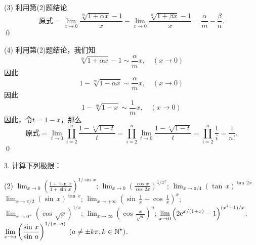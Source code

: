 (3) \solve 利用第(2)题结论
\begin{equation}
    \text{原式} = \lim_{x \to 0} \frac{\sqrt[m]{1+\alpha x}-1}{x} - \lim_{x \to 0} \frac{\sqrt[n]{1+\beta x}-1}{x} = \frac{\alpha}{m} - \frac{\beta}{n}. 
\end{equation}
\qed\bigskip

(4) \solve 利用第(2)题结论，我们知
\begin{equation}
    \sqrt[m]{1+\alpha x} - 1 \sim \frac{\alpha}{m} x, \quad (x \to 0)
\end{equation}
因此
\begin{equation}
    1 - \sqrt[m]{1-\alpha x} \sim \frac{\alpha}{m} x, \quad (x \to 0)
\end{equation}
因此
\begin{equation}
    1 - \sqrt[m]{1-x} \sim \frac{1}{m}x, \quad (x \to 0)
\end{equation}
因此，令$t = 1-x$，那么
\begin{equation}
    \text{原式} = \lim_{t \to 0} \prod_{i=2}^{n} \frac{1-\sqrt[i]{1-t}}{t} = \prod_{i=2}^{n}\lim_{t \to 0} \frac{1-\sqrt[i]{1-t}}{t} = \prod_{i=2}^n \frac{1}{i} = \frac{1}{n!}.
\end{equation}
\qed\bigskip

3. 计算下列极限：
\begin{tasks}(2)
    \task $\displaystyle\lim_{x \to 0}\left(\displaystyle\frac{1+\tan \, x}{1+\sin \, x}\right)^{1/ \sin \, x}$;
    \task $\displaystyle\lim_{x \to 0} \left(\displaystyle\frac{\cos \, x}{\cos \, 2x}\right)^{1/x^2}$;
    \task $\displaystyle\lim_{x \to \pi /4} \left(\tan \, x\right)^{\tan \, 2x}$ 
    \task $\displaystyle\lim_{x \to \pi /2} \left(\sin \, x\right)^{\tan \, x}$;
    \task $\displaystyle\lim_{x \to +\infty} \left(\sin \, \displaystyle\frac{1}{x} + \cos \, \displaystyle\frac{1}{x}\right)^x$;
    \task $\displaystyle\lim_{x \to 0^+} \left(\cos \, \sqrt{x}\right)^{1/x}$;
    \task $\displaystyle\lim_{x \to \infty} \left(\cos \, \displaystyle\frac{x}{\sqrt{n}}\right)^n$;
    \task $\displaystyle\lim_{x \to 0} \left(2 \mathrm{e}^{x/(1+x)}-1\right)^{(x^2+1)/x}$;
    \task $\displaystyle\lim_{x \to a}\left(\displaystyle\frac{\sin \, x}{\sin \, a}\right)^{1/(x-a)} \; (a \neq \pm k \pi, k \in \mathbb{N}^\star)$.
\end{tasks}
\bigskip

